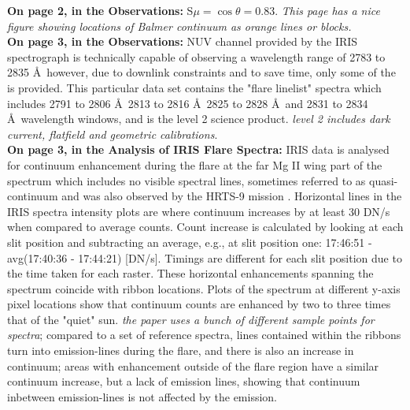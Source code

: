 \documentclass[11pt]{article}
\begin{document}
\textbf{On page 2, in the Observations: } S$\mu = \cos\theta = 0.83$. \emph{This page has a nice figure showing locations of Balmer continuum as orange lines or blocks.} \\
\textbf{On page 3, in the Observations: } NUV channel provided by the IRIS spectrograph is technically capable of observing a wavelength range of 2783 to 2835 \AA\, however, due to downlink constraints and to save time, only some of the is provided. This particular data set contains the "flare linelist" spectra which includes 2791 to 2806 \AA\, 2813 to 2816 \AA\, 2825 to 2828 \AA\ and 2831 to 2834 \AA\ wavelength windows, and is the level 2 science product. \emph{level 2 includes dark current, flatfield and geometric calibrations}.\\
\textbf{On page 3, in the Analysis of IRIS Flare Spectra: } IRIS data is analysed for continuum enhancement during the flare at the far Mg II wing part of the spectrum which includes no visible spectral lines, sometimes referred to as quasi-continuum and was also observed by the HRTS-9 mission \citep{2008ApJ...687..646M}. Horizontal lines in the IRIS spectra intensity plots are where continuum increases by at least 30 DN/s when compared to average counts. Count increase is calculated by looking at each slit position and subtracting an average, e.g., at slit position one: 17:46:51 - avg(17:40:36 - 17:44:21) [DN/s]. Timings are different for each slit position due to the time taken for each raster. These horizontal enhancements spanning the spectrum coincide with ribbon locations. Plots of the spectrum at different y-axis pixel locations show that continuum counts are enhanced by two to three times that of the "quiet" sun. \emph{the paper uses a bunch of different sample points for spectra}; compared to a set of reference spectra, lines contained within the ribbons turn into emission-lines during the flare, and there is also an increase in continuum; areas with enhancement outside of the flare region have a similar continuum increase, but a lack of emission lines, showing that continuum inbetween emission-lines is not affected by the emission. \\
\end{document}
